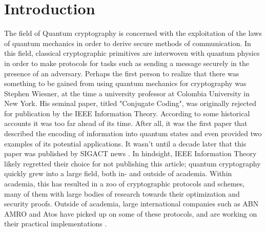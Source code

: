 \documentclass[]{article}
\title{}
\author{}
\begin{document}
\maketitle

\begin{abstract}

\end{abstract}

\section{Introduction}

The field of Quantum cryptography is concerned with the exploitation of the laws of quantum mechanics in order to derive secure methods of communication. In this field, classical cryptographic primitives are interwoven with quantum physics in order to make protocols for tasks such as sending a message securely in the presence of an adversary. Perhaps the first person to realize that there was something to be gained from using quantum mechanics for cryptography was Stephen Wiesner, at the time a university professor at Colombia University in New York. His seminal paper, titled "Conjugate Coding", was originally rejected for publication by the IEEE Information Theory. According to some historical accounts it was too far ahead of its time. After all, it was the first paper that described the encoding of information into quantum states and even provided two examples of its potential applications. It wasn't until a decade later that this paper was published by SIGACT news \cite{WeisnerConjugateCoding}. In hindsight, IEEE Information Theory likely regretted their choice for not publishing this article; quantum cryptography quickly grew into a large field, both in- and outside of academia. Within academia, this has resulted in a zoo of cryptographic protocols and schemes, many of them with large bodies of research towards their optimization and security proofs. Outside of academia, large international companies such as ABN AMRO and Atos have picked up on some of these protocols, and are working on their practical implementations \cite{abnamro,Buding2015}.
\end{document}
